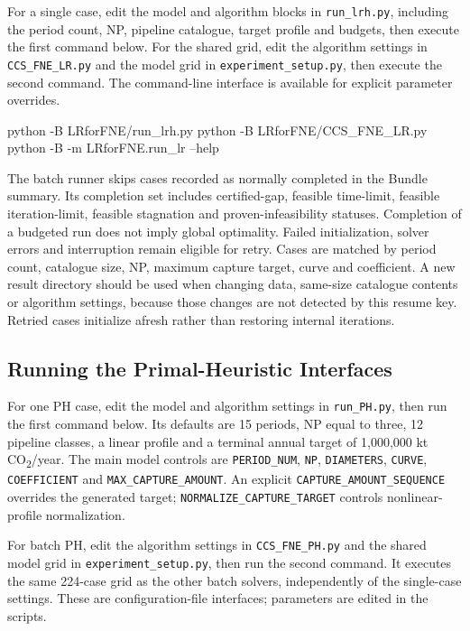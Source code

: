 \documentclass[11pt,letterpaper]{article}
\newcommand{\co}{CO\textsubscript{2}}
\newcommand{\file}[1]{\texttt{\small\nolinkurl{#1}}}
\begin{document}
For a single case, edit the model and algorithm blocks in \file{run_lrh.py}, including the period count, NP, pipeline catalogue, target profile and budgets, then execute the first command below. For the shared grid, edit the algorithm settings in \file{CCS_FNE_LR.py} and the model grid in \file{experiment_setup.py}, then execute the second command. The command-line interface is available for explicit parameter overrides.

\begin{commands}
python -B LRforFNE/run_lrh.py
python -B LRforFNE/CCS_FNE_LR.py
python -B -m LRforFNE.run_lr --help
\end{commands}

The batch runner skips cases recorded as normally completed in the Bundle summary. Its completion set includes certified-gap, feasible time-limit, feasible iteration-limit, feasible stagnation and proven-infeasibility statuses. Completion of a budgeted run does not imply global optimality. Failed initialization, solver errors and interruption remain eligible for retry. Cases are matched by period count, catalogue size, NP, maximum capture target, curve and coefficient. A new result directory should be used when changing data, same-size catalogue contents or algorithm settings, because those changes are not detected by this resume key. Retried cases initialize afresh rather than restoring internal iterations.

\subsection{Running the Primal-Heuristic Interfaces}

For one PH case, edit the model and algorithm settings in \file{run_PH.py}, then run the first command below. Its defaults are 15 periods, NP equal to three, 12 pipeline classes, a linear profile and a terminal annual target of 1,000,000 kt \co/year. The main model controls are \file{PERIOD_NUM}, \file{NP}, \file{DIAMETERS}, \file{CURVE}, \file{COEFFICIENT} and \file{MAX_CAPTURE_AMOUNT}. An explicit \file{CAPTURE_AMOUNT_SEQUENCE} overrides the generated target; \file{NORMALIZE_CAPTURE_TARGET} controls nonlinear-profile normalization.

For batch PH, edit the algorithm settings in \file{CCS_FNE_PH.py} and the shared model grid in \file{experiment_setup.py}, then run the second command. It executes the same 224-case grid as the other batch solvers, independently of the single-case settings. These are configuration-file interfaces; parameters are edited in the scripts.
\end{document}
